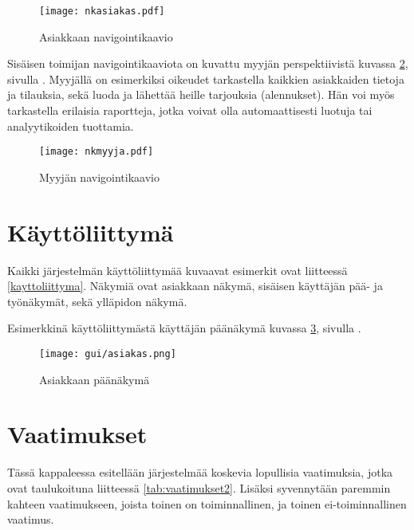     \begin{figure}[h]
        \texttt{[image: nkasiakas.pdf]}
        \caption{Asiakkaan navigointikaavio}
        \label{img:nkasiakas}
    \end{figure}
    
    Sisäisen toimijan navigointikaaviota on kuvattu myyjän perspektiivistä kuvassa \ref{img:nkmyyja}, sivulla \pageref{img:nkmyyja}. Myyjällä on esimerkiksi oikeudet tarkastella kaikkien asiakkaiden tietoja ja tilauksia, sekä luoda ja lähettää heille tarjouksia (alennukset).
    Hän voi myös tarkastella erilaisia raportteja, jotka voivat olla automaattisesti luotuja tai analyytikoiden tuottamia.
    
    \begin{figure}[h]
        \texttt{[image: nkmyyja.pdf]}
        \caption{Myyjän navigointikaavio}
        \label{img:nkmyyja}
    \end{figure}

    \pagebreak

\section{Käyttöliittymä}  %
    
    Kaikki järjestelmän käyttöliittymää kuvaavat esimerkit ovat liitteessä \ref{kayttoliittyma}. Näkymiä ovat asiakkaan näkymä, sisäisen käyttäjän pää- ja työnäkymät, sekä ylläpidon näkymä.
    
    Esimerkkinä käyttöliittymästä käyttäjän päänäkymä kuvassa \ref{img:asiakasesimerkki}, sivulla \pageref{img:asiakasesimerkki}.

    \begin{figure}[h!]
        \texttt{[image: gui/asiakas.png]}
        \caption{Asiakkaan päänäkymä}
        \label{img:asiakasesimerkki}
    \end{figure}

\section{Vaatimukset}       %

    Tässä kappaleessa esitellään järjestelmää koskevia lopullisia vaatimuksia, jotka ovat taulukoituna liitteessä \ref{tab:vaatimukset2}.
    Lisäksi syvennytään paremmin kahteen vaatimukseen, joista toinen on toiminnallinen, ja toinen ei-toiminnallinen
    vaatimus.

